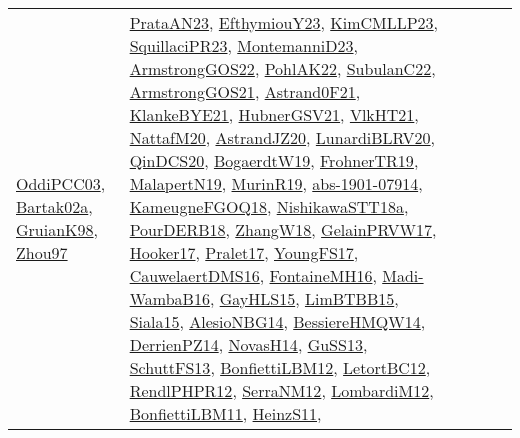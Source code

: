 {\begin{longtable}{lp{3cm}>{\raggedright}p{6cm}>{\raggedright}p{6cm}p{8cm}}
\href{papers/OddiPCC03.pdf}{OddiPCC03}\cite{OddiPCC03}, \href{papers/Bartak02a.pdf}{Bartak02a}\cite{Bartak02a}, \href{papers/GruianK98.pdf}{GruianK98}\cite{GruianK98}, \href{articles/Zhou97.pdf}{Zhou97}\cite{Zhou97} & \href{articles/PrataAN23.pdf}{PrataAN23}\cite{PrataAN23}, \href{papers/EfthymiouY23.pdf}{EfthymiouY23}\cite{EfthymiouY23}, \href{papers/KimCMLLP23.pdf}{KimCMLLP23}\cite{KimCMLLP23}, \href{papers/SquillaciPR23.pdf}{SquillaciPR23}\cite{SquillaciPR23}, \href{articles/MontemanniD23.pdf}{MontemanniD23}\cite{MontemanniD23}, \href{papers/ArmstrongGOS22.pdf}{ArmstrongGOS22}\cite{ArmstrongGOS22}, \href{articles/PohlAK22.pdf}{PohlAK22}\cite{PohlAK22}, \href{articles/SubulanC22.pdf}{SubulanC22}\cite{SubulanC22}, \href{papers/ArmstrongGOS21.pdf}{ArmstrongGOS21}\cite{ArmstrongGOS21}, \href{papers/Astrand0F21.pdf}{Astrand0F21}\cite{Astrand0F21}, \href{papers/KlankeBYE21.pdf}{KlankeBYE21}\cite{KlankeBYE21}, \href{articles/HubnerGSV21.pdf}{HubnerGSV21}\cite{HubnerGSV21}, \href{articles/VlkHT21.pdf}{VlkHT21}\cite{VlkHT21}, \href{papers/NattafM20.pdf}{NattafM20}\cite{NattafM20}, \href{articles/AstrandJZ20.pdf}{AstrandJZ20}\cite{AstrandJZ20}, \href{articles/LunardiBLRV20.pdf}{LunardiBLRV20}\cite{LunardiBLRV20}, \href{articles/QinDCS20.pdf}{QinDCS20}\cite{QinDCS20}, \href{papers/BogaerdtW19.pdf}{BogaerdtW19}\cite{BogaerdtW19}, \href{papers/FrohnerTR19.pdf}{FrohnerTR19}\cite{FrohnerTR19}, \href{papers/MalapertN19.pdf}{MalapertN19}\cite{MalapertN19}, \href{papers/MurinR19.pdf}{MurinR19}\cite{MurinR19}, \href{articles/abs-1901-07914.pdf}{abs-1901-07914}\cite{abs-1901-07914}, \href{papers/KameugneFGOQ18.pdf}{KameugneFGOQ18}\cite{KameugneFGOQ18}, \href{papers/NishikawaSTT18a.pdf}{NishikawaSTT18a}\cite{NishikawaSTT18a}, \href{articles/PourDERB18.pdf}{PourDERB18}\cite{PourDERB18}, \href{articles/ZhangW18.pdf}{ZhangW18}\cite{ZhangW18}, \href{papers/GelainPRVW17.pdf}{GelainPRVW17}\cite{GelainPRVW17}, \href{papers/Hooker17.pdf}{Hooker17}\cite{Hooker17}, \href{papers/Pralet17.pdf}{Pralet17}\cite{Pralet17}, \href{papers/YoungFS17.pdf}{YoungFS17}\cite{YoungFS17}, \href{papers/CauwelaertDMS16.pdf}{CauwelaertDMS16}\cite{CauwelaertDMS16}, \href{papers/FontaineMH16.pdf}{FontaineMH16}\cite{FontaineMH16}, \href{papers/Madi-WambaB16.pdf}{Madi-WambaB16}\cite{Madi-WambaB16}, \href{papers/GayHLS15.pdf}{GayHLS15}\cite{GayHLS15}, \href{papers/LimBTBB15.pdf}{LimBTBB15}\cite{LimBTBB15}, \href{articles/Siala15.pdf}{Siala15}\cite{Siala15}, \href{papers/AlesioNBG14.pdf}{AlesioNBG14}\cite{AlesioNBG14}, \href{papers/BessiereHMQW14.pdf}{BessiereHMQW14}\cite{BessiereHMQW14}, \href{papers/DerrienPZ14.pdf}{DerrienPZ14}\cite{DerrienPZ14}, \href{articles/NovasH14.pdf}{NovasH14}\cite{NovasH14}, \href{papers/GuSS13.pdf}{GuSS13}\cite{GuSS13}, \href{papers/SchuttFS13.pdf}{SchuttFS13}\cite{SchuttFS13}, \href{papers/BonfiettiLBM12.pdf}{BonfiettiLBM12}\cite{BonfiettiLBM12}, \href{papers/LetortBC12.pdf}{LetortBC12}\cite{LetortBC12}, \href{papers/RendlPHPR12.pdf}{RendlPHPR12}\cite{RendlPHPR12}, \href{papers/SerraNM12.pdf}{SerraNM12}\cite{SerraNM12}, \href{articles/LombardiM12.pdf}{LombardiM12}\cite{LombardiM12}, \href{papers/BonfiettiLBM11.pdf}{BonfiettiLBM11}\cite{BonfiettiLBM11}, \href{papers/HeinzS11.pdf}{HeinzS11}\cite{HeinzS11}, 
\end{longtable}}
